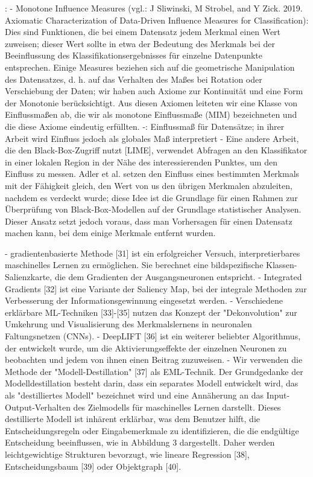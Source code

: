 \cite{strobel2019aspects}:
- Monotone Influence Measures (vgl.: J Sliwinski, M Strobel, and Y Zick. 2019. Axiomatic Characterization of Data-Driven Influence Measures for Classification): Dies sind Funktionen, die bei einem Datensatz jedem Merkmal einen Wert zuweisen; dieser Wert sollte in etwa der Bedeutung des Merkmals bei der Beeinflussung des Klassifikationsergebnisses für einzelne Datenpunkte entsprechen. Einige Measures beziehen sich auf die geometrische Manipulation des Datensatzes, d. h. auf das Verhalten des Maßes bei Rotation oder Verschiebung der Daten; wir haben auch Axiome zur Kontinuität und eine Form der Monotonie berücksichtigt. Aus diesen Axiomen leiteten wir eine Klasse von Einflussmaßen ab, die wir als monotone Einflussmaße (MIM) bezeichneten und die diese Axiome eindeutig erfüllten.
-\cite{datta2016algorithmic}: Einflussmaß für Datensätze; in ihrer Arbeit wird Einfluss jedoch als globales Maß interpretiert 
- Eine andere Arbeit, die den Black-Box-Zugriff nutzt [LIME], verwendet Abfragen an den Klassifikator in einer lokalen Region in der Nähe des interessierenden Punktes, um den Einfluss zu messen. Adler et al. setzen den Einfluss eines bestimmten Merkmals mit der Fähigkeit gleich, den Wert von us den übrigen Merkmalen abzuleiten, nachdem es verdeckt wurde; diese Idee ist die Grundlage für einen Rahmen zur Überprüfung von Black-Box-Modellen auf der Grundlage statistischer Analysen. Dieser Ansatz setzt jedoch voraus, dass man Vorhersagen für einen Datensatz machen kann, bei dem einige Merkmale entfernt wurden.

\cite{pan2021automated}
- gradientenbasierte Methode [31] ist ein erfolgreicher Versuch, interpretierbares maschinelles Lernen zu ermöglichen. Sie berechnet eine bildspezifische Klassen-Salienzkarte, die dem Gradienten der Ausgangsneuronen entspricht. 
- Integrated Gradients [32] ist eine Variante der Saliency Map, bei der integrale Methoden zur Verbesserung der Informationsgewinnung eingesetzt werden. 
- Verschiedene erklärbare ML-Techniken [33]-[35] nutzen das Konzept der "Dekonvolution" zur Umkehrung und Visualisierung des Merkmalslernens in neuronalen Faltungsnetzen (CNNs). 
- DeepLIFT [36] ist ein weiterer beliebter Algorithmus, der entwickelt wurde, um die Aktivierungseffekte der einzelnen Neuronen zu beobachten und jedem von ihnen einen Beitrag zuzuweisen. - Wir verwenden die Methode der "Modell-Destillation" [37] als EML-Technik. Der Grundgedanke der Modelldestillation besteht darin, dass ein separates Modell entwickelt wird, das als "destilliertes Modell" bezeichnet wird und eine Annäherung an das Input-Output-Verhalten des Zielmodells für maschinelles Lernen darstellt. Dieses destillierte Modell ist inhärent erklärbar, was dem Benutzer hilft, die Entscheidungsregeln oder Eingabemerkmale zu identifizieren, die die endgültige Entscheidung beeinflussen, wie in Abbildung 3 dargestellt. Daher werden leichtgewichtige Strukturen bevorzugt, wie lineare Regression [38], Entscheidungsbaum [39] oder Objektgraph [40].

